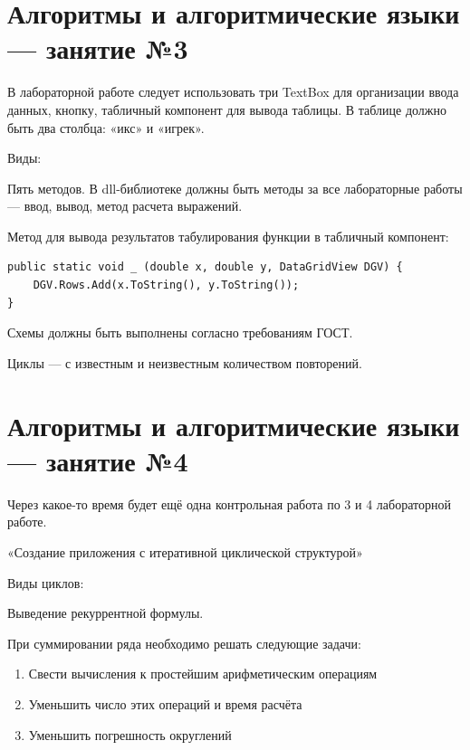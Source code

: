 \documentclass{article}
\begin{document}
\begin{center}
\end{center}

\pagebreak
\section{Алгоритмы и алгоритмические языки — занятие №3}

В лабораторной работе следует использовать три TextBox для организации ввода данных, кнопку, табличный компонент для вывода таблицы. В таблице должно быть два столбца: «икс» и «игрек».

Виды:

\begin{multienumerate}
\end{multienumerate}

Пять методов. В dll-библиотеке должны быть методы за все лабораторные работы — ввод, вывод, метод расчета выражений.

Метод для вывода результатов табулирования функции в табличный компонент:

\begin{verbatim}
public static void _ (double x, double y, DataGridView DGV) {
    DGV.Rows.Add(x.ToString(), y.ToString());
}
\end{verbatim}

Схемы должны быть выполнены согласно требованиям ГОСТ.

Циклы — с известным и неизвестным количеством повторений.

\pagebreak
\section{Алгоритмы и алгоритмические языки — занятие №4}

Через какое-то время будет ещё одна контрольная работа по 3 и 4 лабораторной работе.

«Создание приложения с итеративной циклической структурой»

Виды циклов:

\begin{multienumerate}
\end{multienumerate}

Выведение рекуррентной формулы.

При суммировании ряда необходимо решать следующие задачи:

\begin{enumerate}
    \item Свести вычисления к простейшим арифметическим операциям
    \item Уменьшить число этих операций и время расчёта
    \item Уменьшить погрешность округлений
\end{enumerate}
\end{document}
